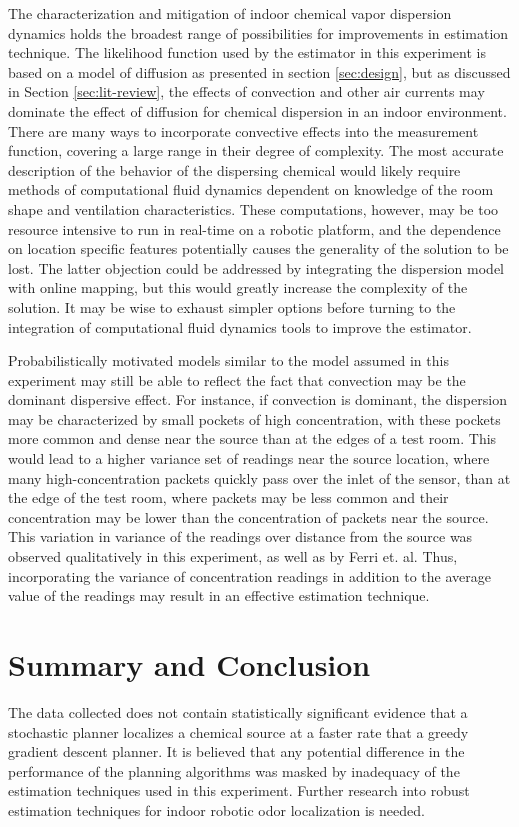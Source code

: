 \documentclass[submit, 12pt]{aiaa-pretty-modified}
\begin{document}
The characterization and mitigation of indoor chemical vapor dispersion dynamics holds the
broadest range of possibilities for improvements in estimation
technique.  The likelihood function used by the estimator in this
experiment is based on a model of diffusion as presented in section \ref{sec:design}, but as discussed in Section
\ref{sec:lit-review}, the effects of convection and other air currents
may dominate the effect of diffusion for
chemical dispersion in an indoor environment. There are many ways to incorporate
convective effects into the measurement function, covering a large range in
their degree of complexity. The most accurate description of the
behavior of the dispersing chemical would likely
require methods of computational fluid dynamics dependent on knowledge of the room
shape and ventilation characteristics. These computations, however, may be
too resource intensive to run in real-time on a robotic platform, and the
dependence on location specific features potentially causes the  generality of the
solution to be lost. The latter objection could be addressed by integrating the dispersion
model with online mapping, but this would greatly increase the complexity of the
solution. It may be wise to exhaust simpler options before turning to
the integration of computational fluid dynamics tools to improve the estimator.

Probabilistically motivated models similar to the model assumed in this experiment may still
be able to reflect the fact that convection may be the dominant dispersive effect. For instance, if
convection is dominant, the dispersion may be characterized by small
pockets of high concentration, with these pockets more common and dense near the
source than at the edges of a test room.  This would lead to a higher
variance set of readings near the source location, where many high-concentration packets quickly pass over the inlet of
the sensor, than at the edge of the test room, where packets may be less
common and their concentration may be lower than the concentration of
packets near the source. This variation in variance of the readings over distance from the source
was observed qualitatively in this
experiment, as well as by Ferri
et. al. \cite{ferri} Thus, incorporating the variance of concentration
readings in addition to the average value of the readings may result
in an effective estimation technique. 


\section{Summary and Conclusion}
The data collected does not contain statistically significant evidence that a
stochastic planner localizes a chemical source at a faster rate that a greedy
gradient descent planner. It is believed that any potential difference
in the performance of the planning
algorithms was masked by inadequacy of the estimation techniques used in this experiment.
Further research into robust estimation techniques for indoor robotic odor
localization is needed.
\end{document}

